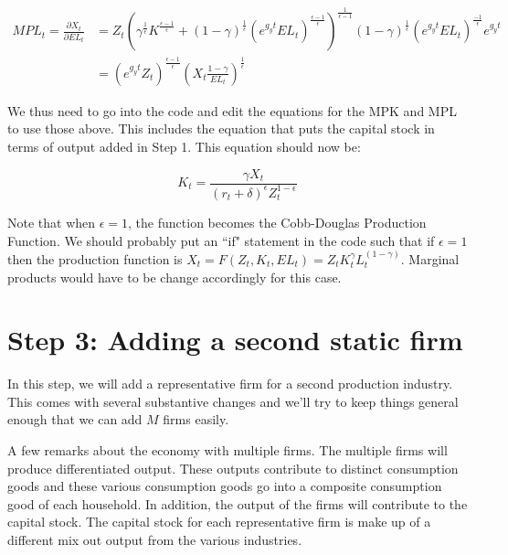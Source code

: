 \documentclass[letterpaper,12pt]{article}
\theoremstyle{definition}
\begin{document}
\begin{equation}
\label{eqn:mpl}
\begin{split}
MPL_{t}=\frac{\partial X_{t}}{\partial EL_{t}}&=Z_{t}\left(\gamma^{\frac{1}{\epsilon}}K^{\frac{\epsilon-1}{\epsilon}} + (1-\gamma)^{\frac{1}{\epsilon}}(e^{g_{y}t}EL_{t})^{\frac{\epsilon-1}{\epsilon}}\right)^{\frac{1}{\epsilon-1}}(1-\gamma)^{\frac{1}{\epsilon}}(e^{g_{y}t}EL_{t})^{\frac{-1}{\epsilon}}e^{g_{y}t}\\
& = (e^{g_{y}t}Z_{t})^{\frac{\epsilon-1}{\epsilon}}\left(X_{t}\frac{1-\gamma}{EL_{t}}\right)^{\frac{1}{\epsilon}}
\end{split}
\end{equation}

We thus need to go into the code and edit the equations for the MPK and MPL to use those above.  This includes the equation that puts the capital stock in terms of output added in Step 1.  This equation should now be: 

\begin{equation}
\label{eqn:cap_demand}
K_{t} = \frac{\gamma X_{t}}{\left(r_{t}+\delta\right)^{\epsilon}Z_{t}^{1-\epsilon}}
\end{equation}

Note that when $\epsilon = 1$, the function becomes the Cobb-Douglas Production Function.  We should probably put an ``if" statement in the code such that if $\epsilon =1$ then the production function is $X_{t}  = F(Z_{t},K_{t},EL_{t})= Z_{t}K_{t}^{\gamma}L_{t}^{(1-\gamma)}$.  Marginal products would have to be change accordingly for this case.


\section*{Step 3: Adding a second static firm}

In this step, we will add a representative firm for a second production industry.  This comes with several substantive changes and we'll try to keep things general enough that we can add $M$ firms easily.

A few remarks about the economy with multiple firms.  The multiple firms will produce differentiated output.  These outputs contribute to distinct consumption goods and these various consumption goods go into a composite consumption good of each household.  In addition, the output of the firms will contribute to the capital stock.  The capital stock for each representative firm is make up of a different mix out output from the various industries.
\end{document}
